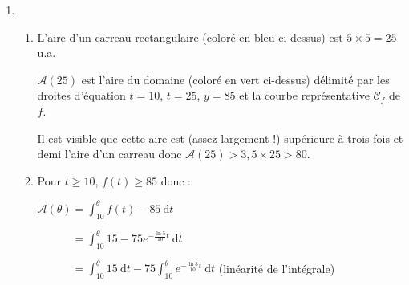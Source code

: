 \begin{corrige}
\begin{enumerate}
\begin{enumerate}[label=\alph*.]
$$               \item
               Comme $f$ est strictement croissante sur $[0~;~+ \infty[$ :
               \par
               $t \geqslant 10 \Rightarrow f(t) \geqslant f(10)$
               \par
               Or :
               \par
               $f(10)=100-75{e}^{- \frac{\ln 5}{10} \times 10}$
               \par
               $\phantom{f(10)}=100-75{e}^{-\ln 5}$
               \par
               $\phantom{f(10)}=100-\frac{75}{{e}^{\ln 5}}$
               \par
               $\phantom{f(10)}=100-\frac{75}{5}=85$
               \par
               Donc pour tout $t \in [0~;~+ \infty[$, $f(t) \geqslant 85$.
          \end{enumerate}
          \item
          \begin{enumerate}
               \item
\begin{center}
\end{center}
               L'aire d'un carreau rectangulaire (coloré en bleu ci-dessus) est $5 \times 5 = 25$ u.a.
               \par
               $\mathcal{A}(25)$ est l'aire du domaine (coloré en vert ci-dessus) délimité par les droites d'équation $t = 10$, $t = 25$, $y = 85$ et la courbe représentative $\mathscr{C}_f$ de $f$.
               \par
               Il est visible que cette aire est (assez largement !) supérieure à trois fois et demi l'aire d'un carreau donc $\mathcal{A}(25)  > 3,5 \times 25  >  80$.
               \item
               Pour $t \geqslant 10$, $f(t) \geqslant 85$ donc :
               \par
               $\mathcal{A}(\theta) = \int_{10}^{\theta} f(t)-85\:\text{d}t$
               \par
               $\phantom{\mathcal{A}(\theta)} = \int_{10}^{\theta} 15-75{e}^{- \frac{\ln 5}{10}t}\:\text{d}t$
               \par
               $\phantom{\mathcal{A}(\theta)} = \int_{10}^{\theta} 15\:\text{d}t-75\int_{10}^{\theta}{e}^{-\frac{\ln 5}{10}t}\:\text{d}t$ (linéarité de l'intégrale)

\end{enumerate}
\end{enumerate}
\end{corrige}
